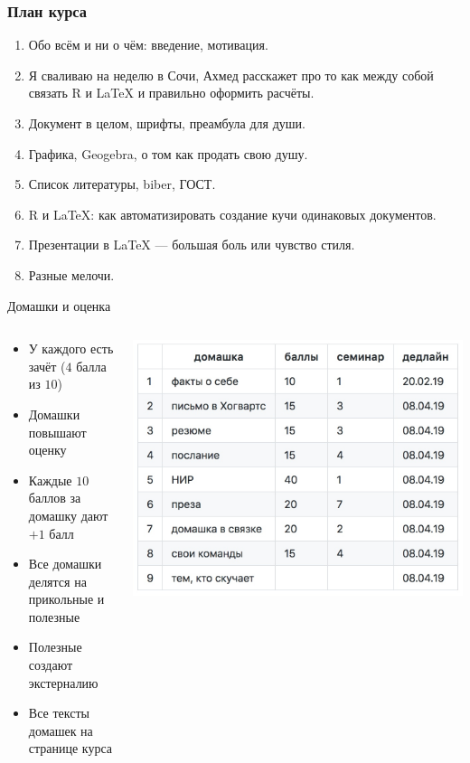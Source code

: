 \documentclass[aspectratio=169,newPxFont]{beamer}
\begin{document}
\begin{frame}
\frametitle{План курса}
\begin{enumerate}
\item Обо всём и ни о чём: введение, мотивация. \pause
\item \alert{Я сваливаю на неделю в Сочи,} \pause Ахмед расскажет про то как между собой связать R и \LaTeX{ } и правильно оформить расчёты.
\item  Документ в целом, шрифты, преамбула для души.
\item  Графика, Geogebra, о том как продать свою душу.
\item  Список литературы, biber, ГОСТ.
\item  R и \LaTeX{:} как автоматизировать создание кучи одинаковых документов.
\item  Презентации в \LaTeX{} — большая боль или чувство стиля.
\item  Разные мелочи.
\end{enumerate}
\end{frame}


\begin{frame}{Домашки и оценка}
\begin{columns}
	\begin{column}{.48\linewidth}
\begin{itemize}
	\item  У каждого есть зачёт ($4$ балла из $10$)
	\item  Домашки  повышают оценку
	\item  Каждые $10$ баллов за домашку дают $+1$ балл
	\item  Все домашки делятся на прикольные и полезные 
	\item  Полезные создают экстерналию 
	\item Все тексты домашек на странице курса
\end{itemize}
	\end{column}	

	\begin{column}{.48\linewidth}
		\includegraphics[scale=0.21]{hw.jpg}
	\end{column}
\end{columns}
\end{frame}
\end{document}

